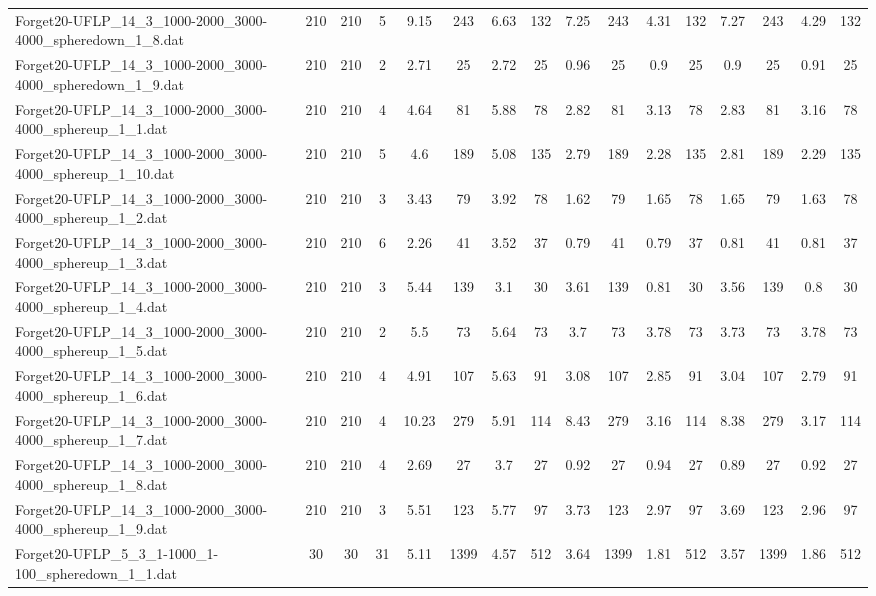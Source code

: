 \begin{sidewaystable}[!ht]
{\begin{tabular}{lccccccccccccccc}
Forget20-UFLP\_14\_3\_1000-2000\_3000-4000\_spheredown\_1\_8.dat & 210 & 210 & 5 & 9.15 & 243 & 6.63 & 132 & 7.25 & 243 & 4.31 & 132 & 7.27 & 243 & 4.29 & 132 \\
Forget20-UFLP\_14\_3\_1000-2000\_3000-4000\_spheredown\_1\_9.dat & 210 & 210 & 2 & 2.71 & 25 & 2.72 & 25 & 0.96 & 25 &  \textcolor{blue2}{0.9} & 25 &  \textcolor{blue2}{0.9} & 25 & 0.91 & 25 \\
Forget20-UFLP\_14\_3\_1000-2000\_3000-4000\_sphereup\_1\_1.dat & 210 & 210 & 4 & 4.64 & 81 & 5.88 & 78 &  \textcolor{blue2}{2.82} & 81 & 3.13 & 78 & 2.83 & 81 & 3.16 & 78 \\
Forget20-UFLP\_14\_3\_1000-2000\_3000-4000\_sphereup\_1\_10.dat & 210 & 210 & 5 & 4.6 & 189 & 5.08 & 135 & 2.79 & 189 & 2.28 & 135 & 2.81 & 189 & 2.29 & 135 \\
Forget20-UFLP\_14\_3\_1000-2000\_3000-4000\_sphereup\_1\_2.dat & 210 & 210 & 3 & 3.43 & 79 & 3.92 & 78 &  \textcolor{blue2}{1.62} & 79 & 1.65 & 78 & 1.65 & 79 & 1.63 & 78 \\
Forget20-UFLP\_14\_3\_1000-2000\_3000-4000\_sphereup\_1\_3.dat & 210 & 210 & 6 & 2.26 & 41 & 3.52 & 37 & 0.79 & 41 & 0.79 & 37 & 0.81 & 41 & 0.81 & 37 \\
Forget20-UFLP\_14\_3\_1000-2000\_3000-4000\_sphereup\_1\_4.dat & 210 & 210 & 3 & 5.44 & 139 & 3.1 & 30 & 3.61 & 139 & 0.81 & 30 & 3.56 & 139 &  \textcolor{blue2}{0.8} & 30 \\
Forget20-UFLP\_14\_3\_1000-2000\_3000-4000\_sphereup\_1\_5.dat & 210 & 210 & 2 & 5.5 & 73 & 5.64 & 73 & 3.7 & 73 & 3.78 & 73 & 3.73 & 73 & 3.78 & 73 \\
Forget20-UFLP\_14\_3\_1000-2000\_3000-4000\_sphereup\_1\_6.dat & 210 & 210 & 4 & 4.91 & 107 & 5.63 & 91 & 3.08 & 107 & 2.85 & 91 & 3.04 & 107 &  \textcolor{blue2}{2.79} & 91 \\
Forget20-UFLP\_14\_3\_1000-2000\_3000-4000\_sphereup\_1\_7.dat & 210 & 210 & 4 & 10.23 & 279 & 5.91 & 114 & 8.43 & 279 & 3.16 & 114 & 8.38 & 279 & 3.17 & 114 \\
Forget20-UFLP\_14\_3\_1000-2000\_3000-4000\_sphereup\_1\_8.dat & 210 & 210 & 4 & 2.69 & 27 & 3.7 & 27 & 0.92 & 27 & 0.94 & 27 & 0.89 & 27 & 0.92 & 27 \\
Forget20-UFLP\_14\_3\_1000-2000\_3000-4000\_sphereup\_1\_9.dat & 210 & 210 & 3 & 5.51 & 123 & 5.77 & 97 & 3.73 & 123 & 2.97 & 97 & 3.69 & 123 & 2.96 & 97 \\
Forget20-UFLP\_5\_3\_1-1000\_1-100\_spheredown\_1\_1.dat & 30 & 30 & 31 & 5.11 & 1399 & 4.57 & 512 & 3.64 & 1399 & 1.81 & 512 & 3.57 & 1399 & 1.86 & 512 \\

\end{tabular}}
\end{sidewaystable}
